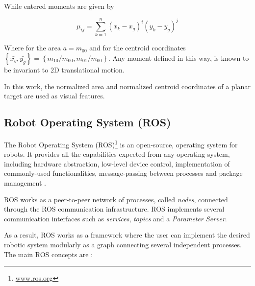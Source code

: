 While entered moments are given by

\begin{equation}
\mu _{ij} = \sum_{k=1}^n \left( x_k - x_g \right)^i \left( y_k - y_g \right)^j
\end{equation}

Where for the area $a = m_{00}$ and for the centroid coordinates $\left\lbrace \bar{x_g}, \bar{y_g} \right\rbrace = \left\lbrace m_{10}/m_{00}, m_{01}/m_{00} \right\rbrace $. Any moment defined in this way, is known to be invariant to 2D translational motion. 

%

In this work, the normalized area and normalized centroid coordinates of a planar target are used as visual features. 

\subsection{Robot Operating System (ROS)}
\label{sec:ROS_theory}

The Robot Operating System (ROS)\footnote{\url{www.ros.org}} is an open-source, operating system for robots. It provides all the capabilities expected from any operating system, including hardware abstraction, low-level device control, implementation of commonly-used functionalities, message-passing between processes and package management \cite{ROS_Intro}.

ROS works as a peer-to-peer network of processes, called \emph{nodes}, connected through the ROS communication infrastructure. ROS implements several communication interfaces such as \emph{services}, \emph{topics} and a \emph{Parameter Server}.

As a result, ROS works as a framework where the user can implement the desired robotic system modularly as a graph connecting several independent processes. The main ROS concepts are \cite{ROS_Concepts}:

